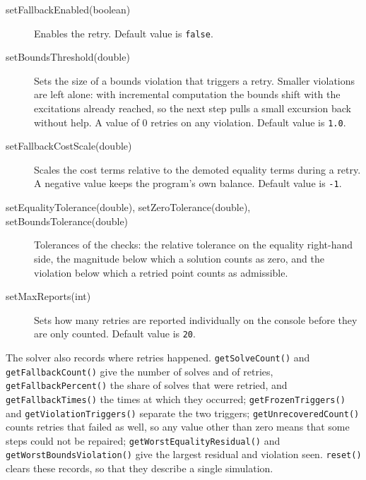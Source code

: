 \begin{description}

\item[setFallbackEnabled(boolean)]\mbox{}

Enables the retry. Default value is {\tt false}.

\item[setBoundsThreshold(double)]\mbox{}

Sets the size of a bounds violation that triggers a retry. Smaller
violations are left alone: with incremental computation the bounds shift
with the excitations already reached, so the next step pulls a small
excursion back without help. A value of 0 retries on any violation.
Default value is {\tt 1.0}.

\item[setFallbackCostScale(double)]\mbox{}

Scales the cost terms relative to the demoted equality terms during a
retry. A negative value keeps the program's own balance. Default value is
{\tt -1}.

\item[setEqualityTolerance(double), setZeroTolerance(double),
setBoundsTolerance(double)]\mbox{}

Tolerances of the checks: the relative tolerance on the equality right-hand
side, the magnitude below which a solution counts as zero, and the
violation below which a retried point counts as admissible.

\item[setMaxReports(int)]\mbox{}

Sets how many retries are reported individually on the console before
they are only counted. Default value is {\tt 20}.

\end{description}

The solver also records where retries happened. {\tt getSolveCount()} and
{\tt getFallbackCount()} give the number of solves and of retries,
{\tt getFallbackPercent()} the share of solves that were retried, and
{\tt getFallbackTimes()} the times at which they occurred;
{\tt getFrozenTriggers()} and {\tt getViolationTriggers()} separate the two
triggers; {\tt getUnrecoveredCount()} counts retries that failed as well,
so any value other than zero means that some steps could not be repaired;
{\tt getWorstEqualityResidual()} and {\tt getWorstBoundsViolation()} give
the largest residual and violation seen. {\tt reset()} clears these
records, so that they describe a single simulation.

